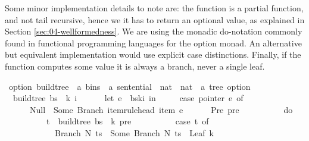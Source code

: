 \begin{isabellebody}
\begin{isamarkuptext}
Some minor implementation details to note are: the function  is a partial function,
and not tail recursive, hence we it has to return an optional value, as explained in Section \ref{sec:04-wellformedness}.
We are using the monadic do-notation commonly found in functional programming languages for the option
monad. An alternative but equivalent implementation would use explicit case distinctions. Finally, if
the function computes some value it is always a branch, never a single leaf.%
\end{isamarkuptext}\isamarkuptrue%
\isamarkupfalse%
\ {\isacharparenleft}{\kern0pt}option{\isacharparenright}{\kern0pt}\ build{\isacharunderscore}{\kern0pt}tree{\isacharprime}{\kern0pt}\ {\isacharcolon}{\kern0pt}{\isacharcolon}{\kern0pt}\ {\isachardoublequoteopen}{\isacharprime}{\kern0pt}a\ bins\ {\isasymRightarrow}\ {\isacharprime}{\kern0pt}a\ sentential\ {\isasymRightarrow}\ nat\ {\isasymRightarrow}\ nat\ {\isasymRightarrow}\ {\isacharprime}{\kern0pt}a\ tree\ option{\isachardoublequoteclose}\ \isanewline
\ \ {\isachardoublequoteopen}build{\isacharunderscore}{\kern0pt}tree{\isacharprime}{\kern0pt}\ bs\ {\isasymomega}\ k\ i\ {\isacharequal}{\kern0pt}\ {\isacharparenleft}{\kern0pt}\isanewline
\ \ \ \ let\ e\ {\isacharequal}{\kern0pt}\ bs{\isacharbang}{\kern0pt}k{\isacharbang}{\kern0pt}i\ in\ {\isacharparenleft}{\kern0pt}\isanewline
\ \ \ \ case\ pointer\ e\ of\isanewline
\ \ \ \ \ \ Null\ {\isasymRightarrow}\ Some\ {\isacharparenleft}{\kern0pt}Branch\ {\isacharparenleft}{\kern0pt}item{\isacharunderscore}{\kern0pt}rule{\isacharunderscore}{\kern0pt}head\ {\isacharparenleft}{\kern0pt}item\ e{\isacharparenright}{\kern0pt}{\isacharparenright}{\kern0pt}\ {\isacharbrackleft}{\kern0pt}{\isacharbrackright}{\kern0pt}{\isacharparenright}{\kern0pt}\isanewline
\ \ \ \ {\isacharbar}{\kern0pt}\ Pre\ pre\ {\isasymRightarrow}\ {\isacharparenleft}{\kern0pt}\isanewline
\ \ \ \ \ \ \ \ do\ {\isacharbraceleft}{\kern0pt}\isanewline
\ \ \ \ \ \ \ \ \ \ t\ {\isasymleftarrow}\ build{\isacharunderscore}{\kern0pt}tree{\isacharprime}{\kern0pt}\ bs\ {\isasymomega}\ {\isacharparenleft}{\kern0pt}k{\isacharminus}{\kern0pt}{}{\isacharparenright}{\kern0pt}\ pre{\isacharsemicolon}{\kern0pt}\isanewline
\ \ \ \ \ \ \ \ \ \ case\ t\ of\isanewline
\ \ \ \ \ \ \ \ \ \ \ \ Branch\ N\ ts\ {\isasymRightarrow}\ Some\ {\isacharparenleft}{\kern0pt}Branch\ N\ {\isacharparenleft}{\kern0pt}ts\ {\isacharat}{\kern0pt}\ {\isacharbrackleft}{\kern0pt}Leaf\ {\isacharparenleft}{\kern0pt}{\isasymomega}{\isacharbang}{\kern0pt}{\isacharparenleft}{\kern0pt}k{\isacharminus}{\kern0pt}{}{\isacharparenright}{\kern0pt}{\isacharparenright}{\kern0pt}{\isacharbrackright}{\kern0pt}{\isacharparenright}{\kern0pt}{\isacharparenright}{\kern0pt}\isanewline

\end{isabellebody}

